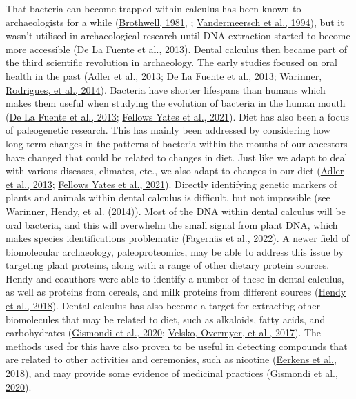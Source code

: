 \documentclass[
  letterpaper,
]{book}
\begin{document}
That bacteria can become trapped within calculus has been known to
archaeologists for a while
(\protect\hyperlink{ref-brothwellDiggingBones1981}{Brothwell, 1981}, ;
\protect\hyperlink{ref-vandermeerschMiddlePaleolithic1994}{Vandermeersch
et al., 1994}), but it wasn't utilised in archaeological research until
DNA extraction started to become more accessible
(\protect\hyperlink{ref-delafuenteDNAHuman2013}{De La Fuente et al.,
2013}). Dental calculus then became part of the third scientific
revolution in archaeology. The early studies focused on oral health in
the past (\protect\hyperlink{ref-adlerSequencingAncient2013}{Adler et
al., 2013}; \protect\hyperlink{ref-delafuenteDNAHuman2013}{De La Fuente
et al., 2013};
\protect\hyperlink{ref-warinnerPathogensHost2014}{Warinner, Rodrigues,
et al., 2014}). Bacteria have shorter lifespans than humans which makes
them useful when studying the evolution of bacteria in the human mouth
(\protect\hyperlink{ref-delafuenteDNAHuman2013}{De La Fuente et al.,
2013}; \protect\hyperlink{ref-yatesOralMicrobiome2021}{Fellows Yates et
al., 2021}). Diet has also been a focus of paleogenetic research. This
has mainly been addressed by considering how long-term changes in the
patterns of bacteria within the mouths of our ancestors have changed
that could be related to changes in diet. Just like we adapt to deal
with various diseases, climates, etc., we also adapt to changes in our
diet (\protect\hyperlink{ref-adlerSequencingAncient2013}{Adler et al.,
2013}; \protect\hyperlink{ref-yatesOralMicrobiome2021}{Fellows Yates et
al., 2021}). Directly identifying genetic markers of plants and animals
within dental calculus is difficult, but not impossible (see Warinner,
Hendy, et al. (\protect\hyperlink{ref-warinnerEvidenceMilk2014}{2014})).
Most of the DNA within dental calculus will be oral bacteria, and this
will overwhelm the small signal from plant DNA, which makes species
identifications problematic
(\protect\hyperlink{ref-fagernasMicrobialBiogeography2022}{Fagernäs et
al., 2022}). A newer field of biomolecular archaeology, paleoproteomics,
may be able to address this issue by targeting plant proteins, along
with a range of other dietary protein sources. Hendy and coauthors were
able to identify a number of these in dental calculus, as well as
proteins from cereals, and milk proteins from different sources
(\protect\hyperlink{ref-hendyProteomicCalculus2018}{Hendy et al.,
2018}). Dental calculus has also become a target for extracting other
biomolecules that may be related to diet, such as alkaloids, fatty
acids, and carbohydrates
(\protect\hyperlink{ref-gismondiMultidisciplinaryApproach2020}{Gismondi
et al., 2020}; \protect\hyperlink{ref-velskoDentalCalculus2017}{Velsko,
Overmyer, et al., 2017}). The methods used for this have also proven to
be useful in detecting compounds that are related to other activities
and ceremonies, such as nicotine
(\protect\hyperlink{ref-eerkensDentalCalculus2018}{Eerkens et al.,
2018}), and may provide some evidence of medicinal practices
(\protect\hyperlink{ref-gismondiMultidisciplinaryApproach2020}{Gismondi
et al., 2020}).
\end{document}
